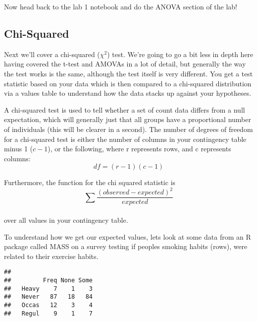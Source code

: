 \documentclass[
]{article}
\newenvironment{Shaded}{\begin{snugshade}}{\end{snugshade}}
\newcommand{\CommentTok}[1]{\textcolor[rgb]{0.56,0.35,0.01}{\textit{#1}}}
\newcommand{\KeywordTok}[1]{\textcolor[rgb]{0.13,0.29,0.53}{\textbf{#1}}}
\newcommand{\NormalTok}[1]{#1}
\newcommand{\OperatorTok}[1]{\textcolor[rgb]{0.81,0.36,0.00}{\textbf{#1}}}
\newcommand{\StringTok}[1]{\textcolor[rgb]{0.31,0.60,0.02}{#1}}
\begin{document}
Now head back to the lab 1 notebook and do the ANOVA section of the lab!

\hypertarget{chi-squared}{%
\subsection{Chi-Squared}\label{chi-squared}}

Next we'll cover a chi-squared (\(\chi^2\)) test. We're going to go a
bit less in depth here having covered the t-test and AMOVAs in a lot of
detail, but generally the way the test works is the same, although the
test itself is very different. You get a test statistic based on your
data which is then compared to a chi-squared distribution via a values
table to understand how the data stacks up against your hypotheses.

A chi-squared test is used to tell whether a set of count data differs
from a null expectation, which will generally just that all groups have
a proportional number of individuals (this will be clearer in a second).
The number of degrees of freedom for a chi-squared test is either the
number of columns in your contingency table minus 1 (\(c-1\)), or the
following, where r represents rows, and c represents columns:
\[df=(r-1)(c-1)\]

Furthermore, the function for the chi squared statistic is
\[\sum{\frac{(observed-expected)^2}{expected}}\]\\
over all values in your contingency table.

To understand how we get our expected values, lets look at some data
from an R package called MASS on a survey testing if peoples smoking
habits (rows), were related to their exercise habits.

\begin{Shaded}
\end{Shaded}

\begin{verbatim}
##        
##         Freq None Some
##   Heavy    7    1    3
##   Never   87   18   84
##   Occas   12    3    4
##   Regul    9    1    7
\end{verbatim}
\end{document}
